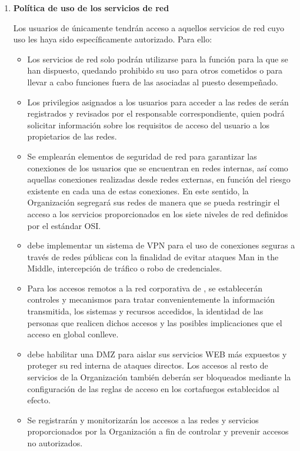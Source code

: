\begin{enumerate}[label=\alph*)]
    \item \textbf{Política de uso de los servicios de red}

    Los usuarios de \Beneficiario{} únicamente tendrán acceso a aquellos servicios de red cuyo uso les haya sido específicamente autorizado. Para ello:
    \begin{itemize}
        \item Los servicios de red solo podrán utilizarse para la función para la que se han dispuesto, quedando prohibido su uso para otros cometidos o para llevar a cabo funciones fuera de las asociadas al puesto desempeñado.
        \item Los privilegios asignados a los usuarios para acceder a las redes de \Beneficiario{} serán registrados y revisados por el responsable correspondiente, quien podrá solicitar información sobre los requisitos de acceso del usuario a los propietarios de las redes.
        \item Se emplearán elementos de seguridad de red para garantizar las conexiones de los usuarios que se encuentran en redes internas, así como aquellas conexiones realizadas desde redes externas, en función del riesgo existente en cada una de estas conexiones. En este sentido, la Organización segregará sus redes de manera que se pueda restringir el acceso a los servicios proporcionados en los siete niveles de red definidos por el estándar OSI.
        \item \Beneficiario{} debe implementar un sistema de VPN para el uso de conexiones seguras a través de redes públicas con la finalidad de evitar ataques Man in the Middle, intercepción de tráfico o robo de credenciales.
        \item Para los accesos remotos a la red corporativa de \Beneficiario{}, se establecerán controles y mecanismos para tratar convenientemente la información transmitida, los sistemas y recursos accedidos, la identidad de las personas que realicen dichos accesos y las posibles implicaciones que el acceso en global conlleve.
        \item \Beneficiario{} debe habilitar una DMZ para aislar sus servicios WEB más expuestos y proteger su red interna de ataques directos. Los accesos al resto de servicios de la Organización también deberán ser bloqueados mediante la configuración de las reglas de acceso en los cortafuegos establecidos al efecto.
        \item Se registrarán y monitorizarán los accesos a las redes y servicios proporcionados por la Organización a fin de controlar y prevenir accesos no autorizados.
    \end{itemize}


\end{enumerate}
